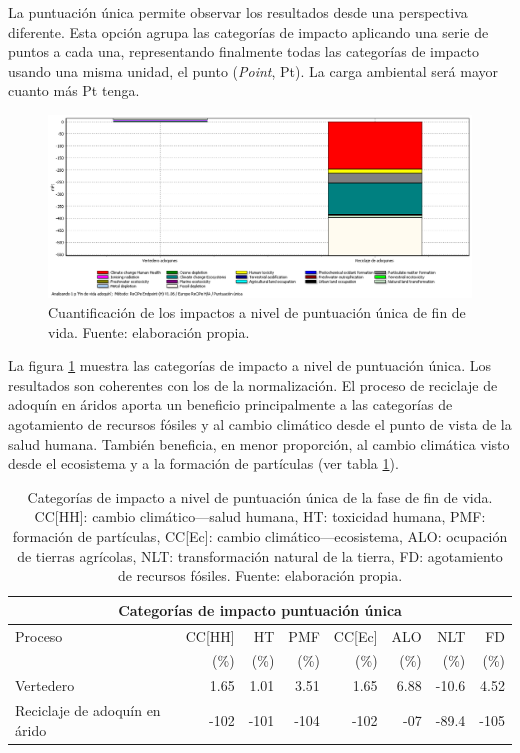 La puntuación única permite observar los resultados desde una perspectiva diferente. Esta opción agrupa las categorías de impacto aplicando una serie de puntos a cada una, representando finalmente todas las categorías de impacto usando una misma unidad, el punto (\textit{Point}, Pt). La carga ambiental será mayor cuanto más Pt tenga.

\begin{figure}[!htb]
\centering
\includegraphics[width=15cm]{img/fdv_puntuacionunica.png}
\caption[Cuantificación de los impactos a nivel de puntuación única de fin de vida.]{Cuantificación de los impactos a nivel de puntuación única de fin de vida. Fuente: elaboración propia.}
\label{fig:fdv_puntuacionunica}
\end{figure}

La figura \ref{fig:fdv_puntuacionunica} muestra las categorías de impacto a nivel de puntuación única. Los resultados son coherentes con los de la normalización. El proceso de reciclaje de adoquín en áridos aporta un beneficio principalmente a las categorías de agotamiento de recursos fósiles y al cambio climático desde el punto de vista de la salud humana. También beneficia, en menor proporción, al cambio climática visto desde el ecosistema y a la formación de partículas (ver tabla \ref{categoriasimpactofdvpuntunica}).

\begin{table}[!htb]
\centering
\begin{tabular}{p{4cm}rrrrrrr}
\toprule
\multicolumn{8}{c}{Categorías de impacto puntuación única}\\
\midrule
Proceso & CC[HH] & HT & PMF & CC[Ec] & ALO & NLT & FD\\
 &  (\%) & (\%) & (\%) & (\%) & (\%) & (\%) & (\%)\\
\midrule
Vertedero & 1.65 & 1.01 & 3.51 & 1.65 & 6.88 & -10.6 & 4.52\\
Reciclaje de adoquín en árido & -102 & -101 & -104 & -102 & -07 & -89.4 & -105\\
\bottomrule
\end{tabular}
\caption[Categorías de impacto a nivel de puntuación única de la fase de fin de vida.]{Categorías de impacto a nivel de puntuación única de la fase de fin de vida. CC[HH]: cambio climático—salud humana, HT: toxicidad humana, PMF: formación de partículas, CC[Ec]: cambio climático—ecosistema, ALO: ocupación de tierras agrícolas, NLT: transformación natural de la tierra, FD: agotamiento de recursos fósiles. Fuente: elaboración propia.}
\label{categoriasimpactofdvpuntunica}
\end{table}

